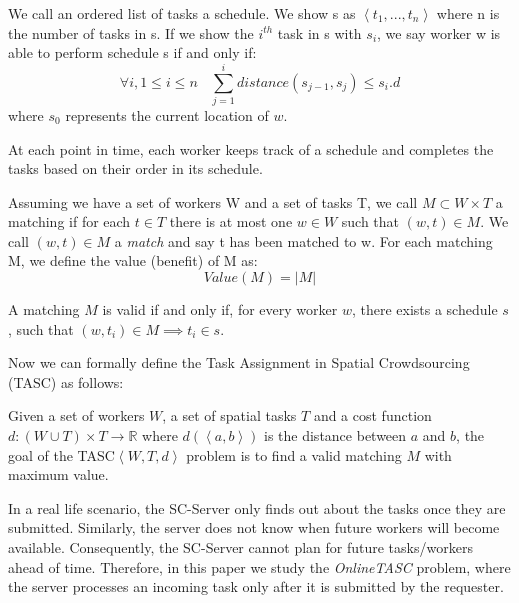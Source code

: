 \begin{definition} [Schedule]
We call an ordered list of tasks a schedule. We show s as $\left\langle t_1, ..., t_n \right\rangle$ where n is the number of tasks in s. If we show the $i^{th}$ task in s with $s_i$, we say worker w is able to perform schedule s if and only if:
\begin{equation*}
\forall i, 1\leq i \leq n \ \ \ \ \sum_{j=1}^i distance(s_{j-1}, s_j) \leq s_i.d
\end{equation*}
where $s_0$ represents the current location of $w$.
\end{definition}

At each point in time, each worker keeps track of a schedule and completes the tasks based on their order in its schedule.

\begin{definition} [Matching]
Assuming we have a set of workers W and a set of tasks T, we call $M \subset W \times T$ a matching if for each $t \in T$ there is at most one $w \in W$ such that $\left( w, t \right) \in M$. We call $\left( w, t \right) \in M$ a \emph{match} and say t has been matched to w. For each matching M, we define the value (benefit) of M as:
\begin{equation*}
Value(M) = \vert M \vert
\end{equation*}
\end{definition}

\noindent A matching $M$ is valid if and only if, for every worker $w$, there exists a schedule $s$, such that $(w, t_i) \in M \implies t_i \in s$. 

Now we can formally define the Task Assignment in Spatial Crowdsourcing (TASC) as follows:

\begin{definition}
Given a set of workers $W$, a set of spatial tasks $T$ and a cost function $d: \left( W \cup T \right) \times T \rightarrow \mathbb{R}$ where $d \left( \left\langle a,b \right\rangle \right)$ is the distance between $a$ and $b$, the goal of the TASC$\left\langle W, T, d \right\rangle$ problem is to find a valid matching $M$ with maximum value.
\end{definition}

In a real life scenario, the SC-Server only finds out about the tasks once they are submitted. Similarly, the server does not know when future workers will become available. Consequently, the SC-Server cannot plan for future tasks/workers ahead of time. Therefore, in this paper we study the \textit{OnlineTASC} problem, where the server processes an incoming task only after it is submitted by the requester. 

